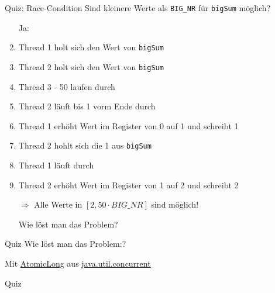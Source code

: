 \documentclass[usepdftitle=false,hyperref={pdfpagelabels=false}]{beamer}
\begin{document}
\begin{frame}{Quiz: Race-Condition}
    Sind kleinere Werte als \texttt{BIG\_NR} für \texttt{bigSum} möglich?
    \begin{enumerate}[<+->]
        \item[] Ja:
        \item Thread 1 holt sich den Wert von \texttt{bigSum}
        \item Thread 2 holt sich den Wert von \texttt{bigSum}
        \item Thread 3 - 50 laufen durch
        \item Thread 2 läuft bis 1 vorm Ende durch
        \item Thread 1 erhöht Wert im Register von 0 auf 1 und schreibt 1
        \item Thread 2 hohlt sich die 1 aus \texttt{bigSum}
        \item Thread 1 läuft durch
        \item Thread 2 erhöht Wert im Register von 1 auf 2 und schreibt 2
        \item[$\Rightarrow$] Alle Werte in $[2, 50 \cdot BIG\_NR]$ sind möglich!
        \item[] Wie löst man das Problem?
    \end{enumerate}
\end{frame}

\begin{frame}{Quiz}
    Wie löst man das Problem:?

    Mit
    \href{http://docs.oracle.com/javase/7/docs/api/java/util/concurrent/atomic/AtomicLong.html}{AtomicLong}
    aus
    \href{http://docs.oracle.com/javase/7/docs/api/java/util/concurrent/package-summary.html}{java.util.concurrent}
\end{frame}

\begin{frame}{Quiz}
    \begin{minipage}[b]{0.45\linewidth}
        \inputminted[linenos=true, numbersep=5pt, tabsize=4, fontsize=\tiny]{java}{AnswerMain.java}
    \end{minipage}
    \hspace{0.5cm}
    \begin{minipage}[b]{0.45\linewidth}
        \inputminted[linenos=true, numbersep=5pt, tabsize=4, fontsize=\tiny]{java}{AnswerSum.java}
        \vspace{3.5cm}
    \end{minipage}
\end{frame}
\end{document}
